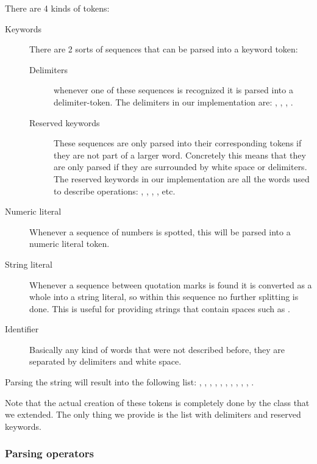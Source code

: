 \par
There are 4 kinds of tokens:
\begin{description} 
\item[Keywords] There are 2 sorts of sequences that can be parsed into a keyword
token:
	\begin{description}
	\item[Delimiters] whenever one of these sequences is recognized it is parsed
	into a delimiter-token. The delimiters in our implementation are: \sn{\{},
	\sn{\}}, \sn{,}, \sn{:}.
	\item[Reserved keywords] These sequences are only parsed into their
	corresponding tokens if they are not part of a larger word. Concretely this
	means that they are only parsed if they are surrounded by white space or
	delimiters. The reserved keywords in our implementation are all the words used
	to describe operations: , , , , etc.
	\end{description}
\item[Numeric literal] Whenever a sequence of numbers is spotted, this will be
parsed into a numeric literal token.
\item[String literal] Whenever a sequence between quotation marks is found it is
converted as a whole into a string literal, so within this sequence no further
splitting is done. This is useful for providing strings that contain spaces
such as .
\item[Identifier] Basically any kind of words that were not described before,
they are separated by delimiters and white space.
\end{description}
	
\par
Parsing the string  will result into
the following list: , , , , , , , ,
, , .
 
\par
Note that the actual creation of these tokens is completely done by the
 class that we extended. The only thing we provide is the
list with delimiters and reserved keywords.


\subsubsection{Parsing operators}

